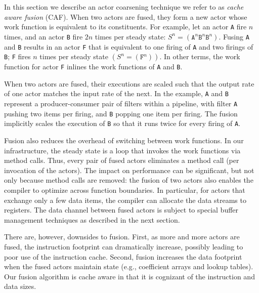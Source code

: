 \documentclass{sigplanconf}
\begin{document}
In this section we describe an actor coarsening technique we refer to
as {\it cache aware fusion} (CAF). When two actors are fused, they
form a new actor whose work function is equivalent to its constituents.
For example, let an actor \texttt{A} fire $n$
times, and an actor \texttt{B} fire $2n$ times per steady state:
$S^n=(\texttt{A}^n\texttt{B}^n\texttt{B}^n)$. Fusing \texttt{A} and
\texttt{B} results in an actor \texttt{F} that is equivalent to one 
firing of \texttt{A} and two 
firings of \texttt{B}; \texttt{F} fires $n$ times per steady state
$(S^n=(\texttt{F}^n))$.  In other terms, the work
function for actor \texttt{F} inlines the work functions of
\texttt{A} and \texttt{B}.

When two actors are fused, their executions are scaled such that the output
rate of one actor matches the input rate of the next. In the example,
\texttt{A} and \texttt{B} represent a producer-consumer pair of
filters within a pipeline, with filter \texttt{A}  
pushing two items per firing, and \texttt{B} popping one item per
firing. The fusion implicitly scales the execution of \texttt{B} so
that it runs twice for every firing of \texttt{A}.


Fusion also reduces the overhead of switching between
work functions. In our infrastructure, the steady state is a loop that
invokes the work functions via method calls. Thus, every pair of fused
actors eliminates a method call (per invocation of the actors). The impact on
performance can be significant, but not only because method calls are
removed: the fusion of two actors also enables the compiler to
optimize across function boundaries. In particular, for actors that
exchange only a few data items, the compiler can allocate the data
streams to registers. 
The data channel between fused actors is
subject to special buffer management techniques as described in the
next section.

There are, however, downsides to fusion. First, as more and more
actors are fused, the instruction footprint can dramatically increase,
possibly leading to poor use of the instruction cache. Second, fusion
increases the data footprint when the fused actors maintain state
(e.g., coefficient arrays and lookup tables). Our fusion algorithm is
cache aware in that it is cognizant of the instruction and data sizes.
\end{document}
